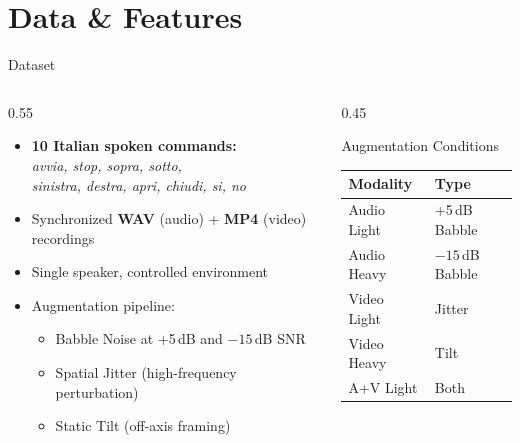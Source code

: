 \documentclass{beamer}
\begin{document}
\section{Data \& Features}

\begin{frame}{Dataset}
  \begin{columns}
    \begin{column}{0.55\textwidth}
      \begin{itemize}
        \item \textbf{10 Italian spoken commands:}\\
              \textit{avvia, stop, sopra, sotto,}\\
              \textit{sinistra, destra, apri, chiudi, si, no}
        \item Synchronized \textbf{WAV} (audio) + \textbf{MP4} (video) recordings
        \item Single speaker, controlled environment
        \item Augmentation pipeline:
              \begin{itemize}
                \item Babble Noise at +5\,dB and $-15$\,dB SNR
                \item Spatial Jitter (high-frequency perturbation)
                \item Static Tilt (off-axis framing)
              \end{itemize}
      \end{itemize}
    \end{column}
    \begin{column}{0.45\textwidth}
      \begin{block}{Augmentation Conditions}
        \begin{tabular}{ll}
          \toprule
          \textbf{Modality} & \textbf{Type}    \\
          \midrule
          Audio Light       & +5\,dB Babble    \\
          Audio Heavy       & $-15$\,dB Babble \\
          Video Light       & Jitter           \\
          Video Heavy       & Tilt             \\
          A+V Light         & Both             \\
          \bottomrule
        \end{tabular}
      \end{block}
    \end{column}
  \end{columns}
\end{frame}
\end{document}
